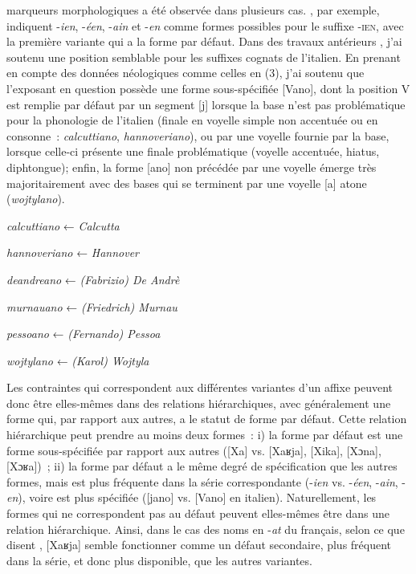 \documentclass[output=paper]{langsci/langscibook}
\begin{document}
marqueurs morphologiques a été observée dans plusieurs cas. 
\citet[191]{LignonStephanie2011}, par exemple, indiquent -\emph{ien}, -\emph{éen},
-\emph{ain} et -\emph{en} comme formes possibles pour le suffixe
-\textsc{ien}, avec la première variante qui a la forme par défaut. Dans
des travaux antérieurs %
\citep{Montermini10,Montermini2015}%
%
, j'ai soutenu une
position semblable pour les suffixes cognats de l'italien. En prenant en
compte des données néologiques comme celles en (3),
j'ai soutenu que l'exposant en question possède une forme sous-spécifiée
{[}Vano{]}, dont la position V est remplie par défaut par un segment
{[}j{]} lorsque la base n'est pas problématique pour la phonologie de
l'italien (finale en voyelle simple non accentuée ou en consonne~:
\emph{calcuttiano}, \emph{hannoveriano}), ou par une voyelle fournie par
la base, lorsque celle-ci présente une finale problématique (voyelle
accentuée, hiatus, diphtongue); enfin, la forme {[}ano{]} non précédée
par une voyelle émerge très majoritairement avec des bases qui se
terminent par une voyelle {[}a{]} atone (\emph{wojtylano}).

\ea
    \ea \emph{calcuttiano} ← \emph{Calcutta}

    \ex \emph{hannoveriano} ← \emph{Hannover}

    \ex \emph{deandreano} ← \emph{(Fabrizio) De Andrè}

    \ex \emph{murnauano} ← \emph{(Friedrich) Murnau}

    \ex \emph{pessoano} ← \emph{(Fernando) Pessoa}

    \ex \emph{wojtylano} ← \emph{(Karol) Wojtyla}
\z\z

 Les
contraintes qui correspondent aux différentes variantes d'un affixe
peuvent donc être elles-mêmes dans des relations hiérarchiques, avec
généralement une forme qui, par rapport aux autres, a le statut de forme
par défaut. Cette relation hiérarchique peut prendre au moins deux
formes~: i) la forme par défaut est une forme sous-spécifiée par rapport
aux autres ({[}Xa{]} vs. {[}Xaʁja{]}, {[}Xika{]}, {[}Xɔna{]},
{[}Xɔʁa{]})~; ii) la forme par défaut a le même degré de spécification
que les autres formes, mais est plus fréquente dans la série
correspondante (-\emph{ien} vs. -\emph{éen}, -\emph{ain}, -\emph{en}),
voire est plus spécifiée ({[}jano{]} vs. {[}Vano{]} en italien).
Naturellement, les formes qui ne correspondent pas au défaut peuvent
elles-mêmes être dans une relation hiérarchique. Ainsi, dans le cas des
noms en -\emph{at} du français, selon ce que disent %
\citet{Plenat-Roche2014}%
%
, {[}Xaʁja{]} semble fonctionner comme un défaut secondaire, plus
fréquent dans la série, et donc plus disponible, que les autres
variantes.
\end{document}
